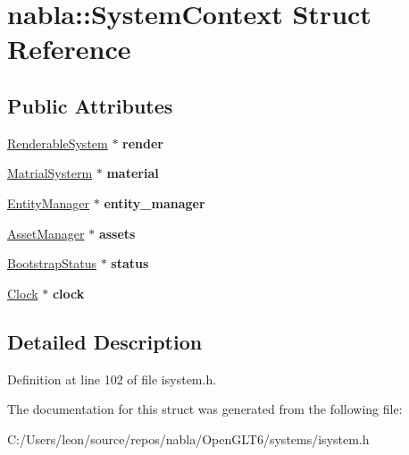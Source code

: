 \hypertarget{structnabla_1_1_system_context}{}\section{nabla\+::System\+Context Struct Reference}
\label{structnabla_1_1_system_context}
\subsection*{Public Attributes}
\begin{DoxyCompactItemize}
\item 
\mbox{\label{structnabla_1_1_system_context_a5525954579ddb6ad92c0df60c9b292bc}} 
\mbox{\hyperlink{classnabla_1_1_renderable_system}{Renderable\+System}} $\ast$ {\bfseries render}
\item 
\mbox{\label{structnabla_1_1_system_context_a9b4e33b2f3bdfa5b64e5eaf2b83e9d48}} 
\mbox{\hyperlink{classnabla_1_1_matrial_systerm}{Matrial\+Systerm}} $\ast$ {\bfseries material}
\item 
\mbox{\label{structnabla_1_1_system_context_a99f6f5b4f9a3c06e0525b0354317ce30}} 
\mbox{\hyperlink{classnabla_1_1_entity_manager}{Entity\+Manager}} $\ast$ {\bfseries entity\+\_\+manager}
\item 
\mbox{\label{structnabla_1_1_system_context_ac66df8f3647c4077271da6ff7b1b34c4}} 
\mbox{\hyperlink{classnabla_1_1_asset_manager}{Asset\+Manager}} $\ast$ {\bfseries assets}
\item 
\mbox{\label{structnabla_1_1_system_context_ae0fb5003bd027f478980d468e6b85800}} 
\mbox{\hyperlink{structnabla_1_1_bootstrap_status}{Bootstrap\+Status}} $\ast$ {\bfseries status}
\item 
\mbox{\label{structnabla_1_1_system_context_a28a607462d0ed21c8125c8bd404c4032}} 
\mbox{\hyperlink{classnabla_1_1_clock}{Clock}} $\ast$ {\bfseries clock}
\end{DoxyCompactItemize}


\subsection{Detailed Description}


Definition at line 102 of file isystem.\+h.



The documentation for this struct was generated from the following file\+:\begin{DoxyCompactItemize}
\item 
C\+:/\+Users/leon/source/repos/nabla/\+Open\+G\+L\+T6/systems/isystem.\+h\end{DoxyCompactItemize}
